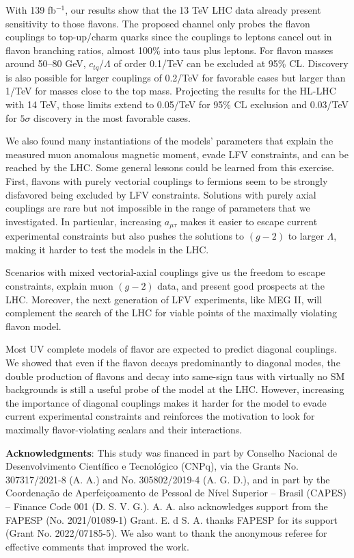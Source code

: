 \documentclass[prd,amsfonts,onecolumn,superscriptaddress,aps,nofootinbib,11pt]{revtex4-1}
\begin{document}
 With 139 fb$^{-1}$, our results show that the 13 TeV LHC data already present sensitivity to those flavons. The proposed channel only probes the flavon couplings to top-up/charm quarks since the couplings to leptons cancel out in flavon branching ratios, almost 100\% into taus plus leptons. For flavon masses around 50--80 GeV, $c_{tq}/\Lambda$ of order 0.1/TeV can be excluded at 95\% CL. Discovery is also possible for larger couplings of 0.2/TeV for favorable cases but larger than 1/TeV for masses close to the top mass. Projecting the results for the HL-LHC with 14 TeV, those limits extend to 0.05/TeV for 95\% CL exclusion and 0.03/TeV for $5\sigma$ discovery in the most favorable cases. 

 We also found many instantiations of the models' parameters that explain the measured muon anomalous magnetic moment, evade LFV constraints, and can be reached by the LHC. Some general lessons could be learned from this exercise. First, flavons with purely vectorial couplings to fermions seem to be strongly disfavored being excluded by LFV constraints. Solutions with purely axial couplings are rare but not impossible in the range of parameters that we investigated. In particular, increasing $a_{\mu\tau}$ makes it easier to escape current experimental constraints but also pushes the solutions to $(g-2)$ to larger $\Lambda$, making it harder to test the models in the LHC.

 Scenarios with mixed vectorial-axial couplings give us the freedom to escape constraints, explain muon $(g-2)$ data, and present good prospects at the LHC. Moreover, the next generation of LFV experiments, like MEG II, will complement the search of the LHC for viable points of the maximally violating flavon model. 

Most UV complete models of flavor are expected to predict diagonal couplings. We showed that even if the flavon decays predominantly to diagonal modes, the double production of flavons and decay into same-sign taus with virtually no SM backgrounds is still a useful probe of the model at the LHC. However, increasing the importance of diagonal couplings makes it harder for the model to evade current experimental constraints and reinforces the motivation to look for maximally flavor-violating scalars and their interactions.
	
\bigskip{}
	
\textbf{Acknowledgments}: This study was financed in part by Conselho Nacional de Desenvolvimento Científico e Tecnológico (CNPq), via the Grants No. 307317/2021-8 (A. A.) and No. 305802/2019-4 (A. G. D.), and in part by the Coordenação de Aperfeiçoamento de Pessoal de Nível Superior – Brasil (CAPES) – Finance Code 001 (D. S. V. G.). A. A. also acknowledges support from the FAPESP (No. 2021/01089-1) Grant. E. d S. A. thanks FAPESP for its support  (Grant  No.  2022/07185-5). We also want to thank the anonymous referee for effective comments that improved the work.
	
\end{document}

